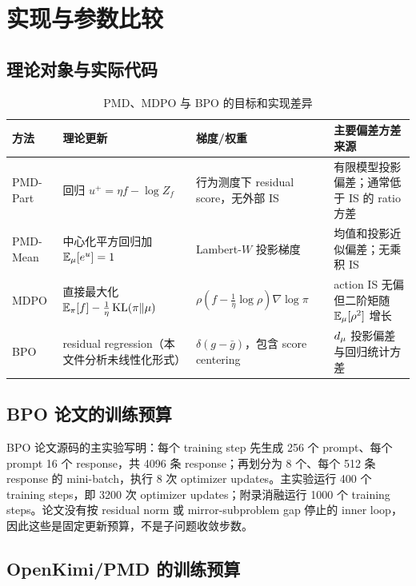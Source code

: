 \chapter{实现与参数比较}

\label{ch:implementation}

\section{理论对象与实际代码}
\label{sec:implementation-table}

\begin{table}[H]
\centering
\caption{PMD、MDPO 与 BPO 的目标和实现差异}
\label{tab:method-comparison}
\begin{tabular}{P{0.16\textwidth}P{0.23\textwidth}P{0.23\textwidth}P{0.25\textwidth}}
\toprule
方法 & 理论更新 & 梯度/权重 & 主要偏差方差来源 \\
\midrule
PMD-Part & 回归 $u^+=\eta f-\log Z_f$ & 行为测度下 residual score，无外部 IS & 有限模型投影偏差；通常低于 IS 的 ratio 方差 \\
PMD-Mean & 中心化平方回归加 $\mathbb{E}_\mu[e^u]=1$ & Lambert-$W$ 投影梯度 & 均值和投影近似偏差；无乘积 IS \\
MDPO & 直接最大化 $\mathbb{E}_\pi[f]-\frac1\eta\operatorname{KL}(\pi\Vert\mu)$ & $\rho(f-\frac1\eta\log\rho)\nabla\log\pi$ & action IS 无偏但二阶矩随 $\mathbb{E}_\mu[\rho^2]$ 增长 \\
BPO & residual regression（本文件分析未线性化形式） & $\delta(g-\bar g)$，包含 score centering & $d_\mu$ 投影偏差与回归统计方差 \\
\bottomrule
\end{tabular}
\end{table}

\section{BPO 论文的训练预算}
\label{sec:bpo-implementation}

BPO 论文源码的主实验写明：每个 training step 先生成 256 个 prompt、每个 prompt 16 个 response，共 4096 条 response；再划分为 8 个、每个 512 条 response 的 mini-batch，执行 8 次 optimizer updates。主实验运行 400 个 training steps，即 3200 次 optimizer updates；附录消融运行 1000 个 training steps。论文没有按 residual norm 或 mirror-subproblem gap 停止的 inner loop，因此这些是固定更新预算，不是子问题收敛步数。

\section{OpenKimi/PMD 的训练预算}
\label{sec:openkimi-implementation}

